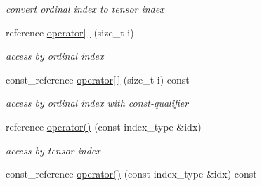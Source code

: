\begin{DoxyCompactItemize}
\begin{DoxyCompactList}\small\item\em convert ordinal index to tensor index \item\end{DoxyCompactList}\item 
\hypertarget{classbtas_1_1_tensor_3_01_t_00_010ul_00_01_order_01_4_a6db3cca14395261b35f5c5b5c581175c}{
reference \hyperlink{classbtas_1_1_tensor_3_01_t_00_010ul_00_01_order_01_4_a6db3cca14395261b35f5c5b5c581175c}{operator\mbox{[}$\,$\mbox{]}} (size\_\-t i)}
\label{classbtas_1_1_tensor_3_01_t_00_010ul_00_01_order_01_4_a6db3cca14395261b35f5c5b5c581175c}

\begin{DoxyCompactList}\small\item\em access by ordinal index \item\end{DoxyCompactList}\item 
\hypertarget{classbtas_1_1_tensor_3_01_t_00_010ul_00_01_order_01_4_ad79fe300dda0b9f7e7937f2e2b0e791d}{
const\_\-reference \hyperlink{classbtas_1_1_tensor_3_01_t_00_010ul_00_01_order_01_4_ad79fe300dda0b9f7e7937f2e2b0e791d}{operator\mbox{[}$\,$\mbox{]}} (size\_\-t i) const }
\label{classbtas_1_1_tensor_3_01_t_00_010ul_00_01_order_01_4_ad79fe300dda0b9f7e7937f2e2b0e791d}

\begin{DoxyCompactList}\small\item\em access by ordinal index with const-\/qualifier \item\end{DoxyCompactList}\item 
\hypertarget{classbtas_1_1_tensor_3_01_t_00_010ul_00_01_order_01_4_a3491d7a99581d6b4a7daad68409f385f}{
reference \hyperlink{classbtas_1_1_tensor_3_01_t_00_010ul_00_01_order_01_4_a3491d7a99581d6b4a7daad68409f385f}{operator()} (const index\_\-type \&idx)}
\label{classbtas_1_1_tensor_3_01_t_00_010ul_00_01_order_01_4_a3491d7a99581d6b4a7daad68409f385f}

\begin{DoxyCompactList}\small\item\em access by tensor index \item\end{DoxyCompactList}\item 
\hypertarget{classbtas_1_1_tensor_3_01_t_00_010ul_00_01_order_01_4_a53c08e7da2523f734312c87d569c0b01}{
const\_\-reference \hyperlink{classbtas_1_1_tensor_3_01_t_00_010ul_00_01_order_01_4_a53c08e7da2523f734312c87d569c0b01}{operator()} (const index\_\-type \&idx) const }
\label{classbtas_1_1_tensor_3_01_t_00_010ul_00_01_order_01_4_a53c08e7da2523f734312c87d569c0b01}


\end{DoxyCompactItemize}
